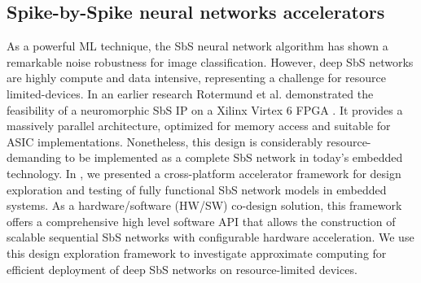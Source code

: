 \subsection{Spike-by-Spike neural networks accelerators}
As a powerful ML technique, the SbS neural network algorithm has shown a remarkable noise robustness for image classification\cite{nevarez2020accelerator}. However, deep SbS networks are highly compute and data intensive, representing a challenge for resource limited-devices. In an earlier research Rotermund et al. demonstrated the feasibility of a neuromorphic SbS IP on a Xilinx Virtex 6 FPGA \cite{rotermund2018massively}. It provides a massively parallel architecture, optimized for memory access and suitable for ASIC implementations. Nonetheless, this design is considerably resource-demanding to be implemented as a complete SbS network in today's embedded technology. In \cite{nevarez2020accelerator}, we presented a cross-platform accelerator framework for design exploration and testing of fully functional SbS network models in embedded systems. As a hardware/software (HW/SW) co-design solution, this framework offers a comprehensive high level software API that allows the construction of scalable sequential SbS networks with configurable hardware acceleration. We use this design exploration framework to investigate approximate computing for efficient deployment of deep SbS networks on resource-limited devices.
